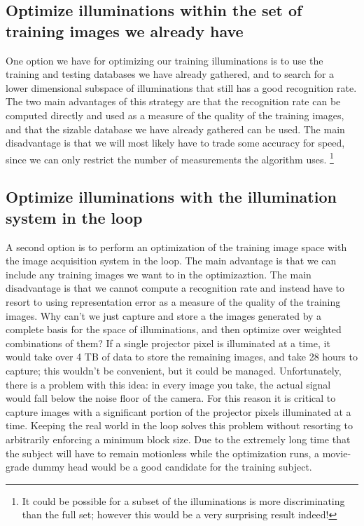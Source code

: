 \subsection{Optimize illuminations within the set of training images we already have}
One option we have for optimizing our training illuminations is to use the training and testing databases we have already gathered, and to search for a lower dimensional subspace of illuminations that still has a good recognition rate.  The two main advantages of this strategy are that the recognition rate can be computed directly and used as a measure of the quality of the training images, and that the sizable database we have already gathered can be used.  The main disadvantage is that we will most likely have to trade some accuracy for speed, since we can only restrict the number of measurements the algorithm uses. \footnote{It could be possible for a subset of the illuminations is more discriminating than the full set; however this would be a very surprising result indeed!}

\subsection{Optimize illuminations with the illumination system in the loop}
A second option is to perform an optimization of the training image space with the image acquisition system in the loop.  The main advantage is that we can include any training images we want to in the optimizaztion.  The main disadvantage is that we cannot compute a recognition rate and instead have to resort to using representation error as a measure of the quality of the training images.  Why can't we just capture and store a the images generated by a complete basis for the space of illuminations, and then optimize over weighted combinations of them?  If a single projector pixel is illuminated at a time, it would take over 4 TB of data to store the remaining images, and take 28 hours to capture; this wouldn't be convenient, but it could be managed.  Unfortunately, there is a problem with this idea:  in every image you take, the actual signal would fall below the noise floor of the camera.  For this reason it is critical to capture images with a significant portion of the projector pixels illuminated at a time.  Keeping the real world in the loop solves this problem without resorting to arbitrarily enforcing a minimum block size.  Due to the extremely long time that the subject will have to remain motionless while the optimization runs, a movie-grade dummy head would be a good candidate for the training subject.  


